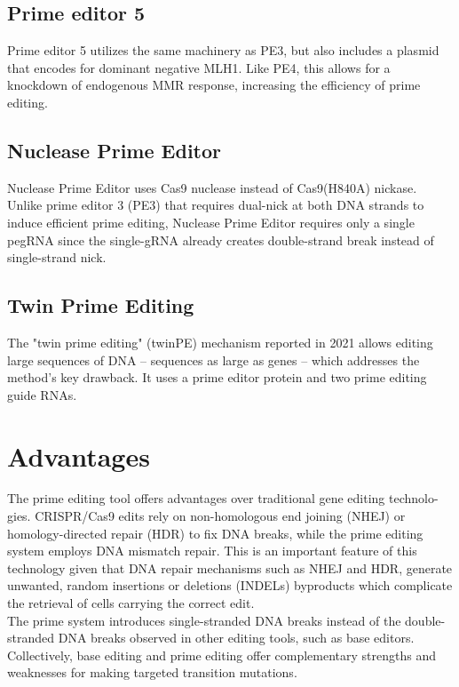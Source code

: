 \documentclass[a4paper,12pt]{extarticle}
\begin{document}
\subsection{Prime editor 5}

Prime editor 5 utilizes the same machinery as PE3, but also includes a plasmid that encodes for dominant negative MLH1. Like PE4, this allows for a knockdown of endogenous MMR response, increasing the efficiency of prime editing.

\subsection{Nuclease Prime Editor}

Nuclease Prime Editor uses Cas9 nuclease instead of Cas9(H840A) nickase. Unlike prime editor 3 (PE3) that requires dual-nick at both DNA strands to induce efficient prime editing, Nuclease Prime Editor requires only a single pegRNA since the single-gRNA already creates double-strand break instead of single-strand nick.

\subsection{Twin Prime Editing}

The "twin prime editing" (twinPE) mechanism reported in 2021 allows editing large sequences of DNA – sequences as large as genes – which addresses the method's key drawback. It uses a prime editor protein and two prime editing guide RNAs.

\section{Advantages}

The prime editing tool offers advantages over traditional gene editing technolo- gies. CRISPR/Cas9 edits rely on non-homologous end joining (NHEJ) or homology-directed repair (HDR) to fix DNA breaks, while the prime editing system employs DNA mismatch repair. This is an important feature of this technology given that DNA repair mechanisms such as NHEJ and HDR, generate unwanted, random insertions or deletions (INDELs) byproducts which complicate the retrieval of cells carrying the correct edit.\\

The prime system introduces single-stranded DNA breaks instead of the double-stranded DNA breaks observed in other editing tools, such as base editors. Collectively, base editing and prime editing offer complementary strengths and weaknesses for making targeted transition mutations.\\
\end{document}
